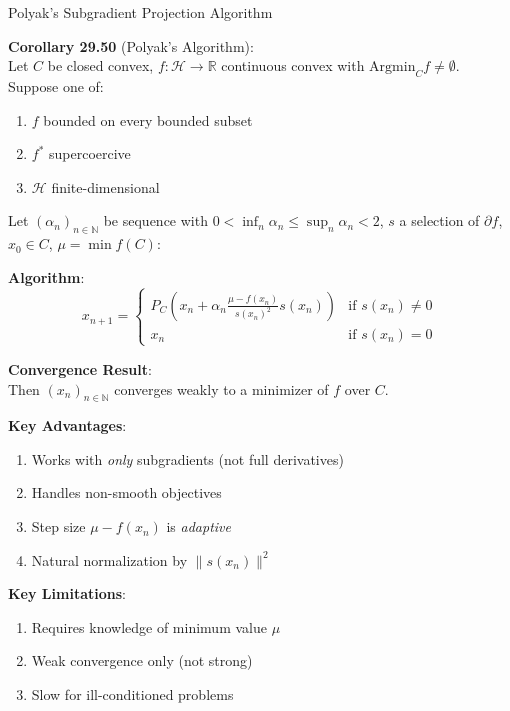 \documentclass[aspectratio=169,10pt]{beamer}
\begin{document}
\begin{frame}[allowframebreaks]{Polyak's Subgradient Projection Algorithm}

    \textbf{Corollary 29.50} (Polyak's Algorithm):\\
    Let $C$ be closed convex, $f: \mathcal{H} \to \mathbb{R}$ continuous convex with $\text{Argmin}_C f \neq \emptyset$.\\
    Suppose one of:
    \begin{enumerate}
        \item[(i)] $f$ bounded on every bounded subset
        \item[(ii)] $f^*$ supercoercive
        \item[(iii)] $\mathcal{H}$ finite-dimensional
    \end{enumerate}

    Let $(\alpha_n)_{n \in \mathbb{N}}$ be sequence with $0 < \inf_n \alpha_n \leq \sup_n \alpha_n < 2$, $s$ a selection of $\partial f$, $x_0 \in C$, $\mu = \min f(C)$:

    \vspace{0.3cm}

    \textbf{Algorithm}:
    $$x_{n+1} = \begin{cases}
    P_C\left(x_n + \alpha_n \frac{\mu - f(x_n)}{s(x_n)^2} s(x_n)\right) & \text{if } s(x_n) \neq 0 \\
    x_n & \text{if } s(x_n) = 0
    \end{cases}$$

    \vspace{0.3cm}

    \framebreak

    \textbf{Convergence Result}:\\
    Then $(x_n)_{n \in \mathbb{N}}$ converges weakly to a minimizer of $f$ over $C$.

    \vspace{0.5cm}

    \textbf{Key Advantages}:
    \begin{enumerate}
        \item Works with \textit{only} subgradients (not full derivatives)
        \item Handles non-smooth objectives
        \item Step size $\mu - f(x_n)$ is \textit{adaptive}
        \item Natural normalization by $\|s(x_n)\|^2$
    \end{enumerate}

    \vspace{0.5cm}

    \textbf{Key Limitations}:
    \begin{enumerate}
        \item Requires knowledge of minimum value $\mu$
        \item Weak convergence only (not strong)
        \item Slow for ill-conditioned problems
    \end{enumerate}

\end{frame}
\end{document}
